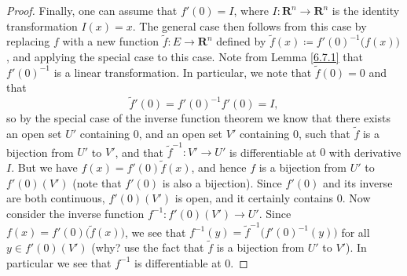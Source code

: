 \begin{proof}
    Finally, one can assume that \(f'(0) = I\), where \(I : \mathbf{R}^n \to \mathbf{R}^n\) is the identity transformation \(I(x) = x\).
    The general case then follows from this case by replacing \(f\) with a new function \(\tilde{f} : E \to \mathbf{R}^n\) defined by \(\tilde{f}(x) \coloneqq f'(0)^{-1}\big(f(x)\big)\), and applying the special case to this case.
    Note from Lemma \ref{6.7.1} that \(f'(0)^{-1}\) is a linear transformation.
    In particular, we note that \(\tilde{f}(0) = 0\) and that
    \[
        \tilde{f}'(0) = f'(0)^{-1} f'(0) = I,
    \]
    so by the special case of the inverse function theorem we know that there exists an open set \(U'\) containing \(0\), and an open set \(V'\) containing \(0\), such that \(\tilde{f}\) is a bijection from \(U'\) to \(V'\), and that \(\tilde{f}^{-1} : V' \to U'\) is differentiable at \(0\) with derivative \(I\).
    But we have \(f(x) = f'(0) \tilde{f}(x)\), and hence \(f\) is a bijection from \(U'\) to \(f'(0)(V')\)
    (note that \(f'(0)\) is also a bijection).
    Since \(f'(0)\) and its inverse are both continuous, \(f'(0)(V')\) is open, and it certainly contains \(0\).
    Now consider the inverse function \(f^{-1} : f'(0)(V') \to U'\).
    Since \(f(x) = f'(0)\big(\tilde{f}(x)\big)\), we see that \(f^{-1}(y) = \tilde{f}^{-1}\big(f'(0)^{-1}(y)\big)\) for all \(y \in f'(0)(V')\)
    (why? use the fact that \(\tilde{f}\) is a bijection from \(U'\) to \(V'\)).
    In particular we see that \(f^{-1}\) is differentiable at \(0\).


\end{proof}
